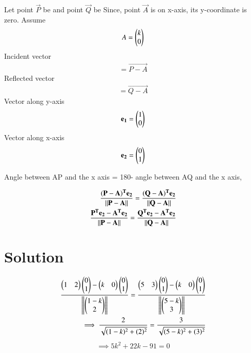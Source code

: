 Let point $\vec{P}$ be  and point $\vec{Q}$ be 
Since, point $\vec{A}$ is on x-axis, its y-coordinate is zero.
Assume \begin{align}
    A=\begin{pmatrix}k\\0\end{pmatrix}
\end{align}
Incident vector
 \begin{align}
     = \vec{P-A}
\end{align}
Reflected vector 
\begin{align}
    = \vec{Q-A}
\end{align}
Vector along y-axis
\begin{align}
\mathbf{e_1} =\begin{pmatrix}1\\0\end{pmatrix}\\
\end{align}
Vector along x-axis
\begin{align}
 \mathbf{e_2} =\begin{pmatrix}0\\1\end{pmatrix}
\end{align}

Angle between AP and the x axis = 180\degree - angle between AQ and the x axis,

\begin{align}
\dfrac{\vec{(P-A)^T} \Vec{e_2}}{\norm{\Vec{P-A}}}=\dfrac{\vec{(Q-A)^T} \Vec{e_2}}{\norm{\Vec{Q-A}}}
\\
\dfrac{\vec{P^T}\Vec{e_2}-\Vec{A^T}\Vec{e_2}}{ \norm{\Vec{P-A}}}=\dfrac{\vec{Q^T}\Vec{e_2}-\Vec{A^T}\Vec{e_2}}{\norm{\Vec{Q-A}}}
\end{align}

\section{Solution}
\begin{align}
 \dfrac{\begin{pmatrix}1 & 2\end{pmatrix}\begin{pmatrix}0\\1\end{pmatrix}-\begin{pmatrix}k & 0\end{pmatrix}\begin{pmatrix}0\\1\end{pmatrix}}{\left\lVert\begin{pmatrix}1-k \\ 2\end{pmatrix}\right\rVert}=\dfrac{\begin{pmatrix}5 & 3\end{pmatrix}\begin{pmatrix}0\\1\end{pmatrix}-\begin{pmatrix}k & 0\end{pmatrix}\begin{pmatrix}0\\1\end{pmatrix}}{\left\lVert\begin{pmatrix}5-k\\3\end{pmatrix}\right\rVert}
 \\
 \implies \dfrac{2}{\sqrt{(1-k)^2+(2)^2}}=\dfrac{3}{\sqrt{(5-k)^2+(3)^2}}
\end{align}
\begin{align}
    \label{eq:solutions/line_plane/59/output1}
       \implies 5k^2+22k-91=0 
\end{align}

